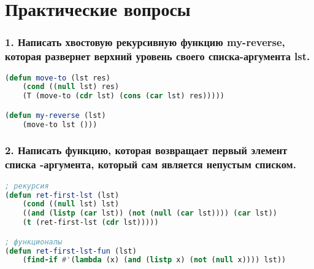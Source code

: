 \section*{Практические вопросы}


\subsubsection*{1. Написать хвостовую рекурсивную функцию my-reverse, которая развернет верхний	уровень своего списка-аргумента lst.}
\begin{lstlisting}[language=Lisp]
(defun move-to (lst res)
	(cond ((null lst) res)
	(T (move-to (cdr lst) (cons (car lst) res)))))

(defun my-reverse (lst)
	(move-to lst ()))
\end{lstlisting}


\subsubsection*{2. Написать функцию, которая возвращает первый элемент списка -аргумента, который сам	является непустым списком.}

\begin{lstlisting}[language=Lisp]
; рекурсия
(defun ret-first-lst (lst)
	(cond ((null lst) lst)
	((and (listp (car lst)) (not (null (car lst)))) (car lst))
	(t (ret-first-lst (cdr lst)))))

; функционалы
(defun ret-first-lst-fun (lst)
	(find-if #'(lambda (x) (and (listp x) (not (null x)))) lst))
\end{lstlisting}

\newpage
